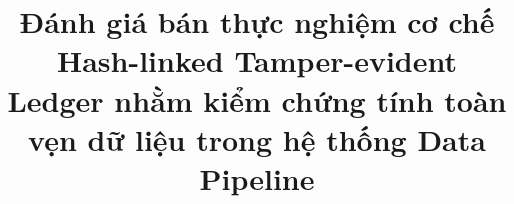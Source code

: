 \documentclass[conference]{IEEEtran}
\begin{document}
\title{Đánh giá bán thực nghiệm cơ chế Hash-linked Tamper-evident Ledger nhằm kiểm chứng tính toàn vẹn dữ liệu trong hệ thống Data Pipeline}

\author{
}

\maketitle












\end{document}
